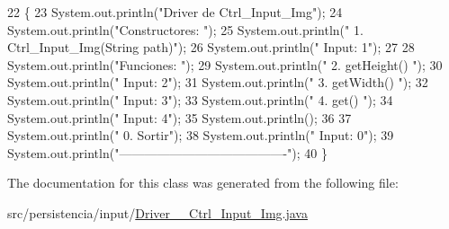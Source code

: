 \begin{DoxyCode}
22                                      \{
23         System.out.println(\textcolor{stringliteral}{"Driver de Ctrl\_Input\_Img"});
24         System.out.println(\textcolor{stringliteral}{"Constructores: "});
25         System.out.println(\textcolor{stringliteral}{"     1. Ctrl\_Input\_Img(String path)"});
26         System.out.println(\textcolor{stringliteral}{"     Input: 1"});
27 
28         System.out.println(\textcolor{stringliteral}{"Funciones: "});
29         System.out.println(\textcolor{stringliteral}{"     2. getHeight() "});
30         System.out.println(\textcolor{stringliteral}{"     Input: 2"});
31         System.out.println(\textcolor{stringliteral}{"     3. getWidth() "});
32         System.out.println(\textcolor{stringliteral}{"     Input: 3"});
33         System.out.println(\textcolor{stringliteral}{"     4. get() "});
34         System.out.println(\textcolor{stringliteral}{"     Input: 4"});
35         System.out.println();
36 
37         System.out.println(\textcolor{stringliteral}{"     0. Sortir"});
38         System.out.println(\textcolor{stringliteral}{"     Input: 0"});
39         System.out.println(\textcolor{stringliteral}{"----------------------------------------"});
40     \}
\end{DoxyCode}


The documentation for this class was generated from the following file\+:\begin{DoxyCompactItemize}
\item 
src/persistencia/input/\hyperlink{Driver____Ctrl__Input__Img_8java}{Driver\+\_\+\+\_\+\+Ctrl\+\_\+\+Input\+\_\+\+Img.\+java}\end{DoxyCompactItemize}
